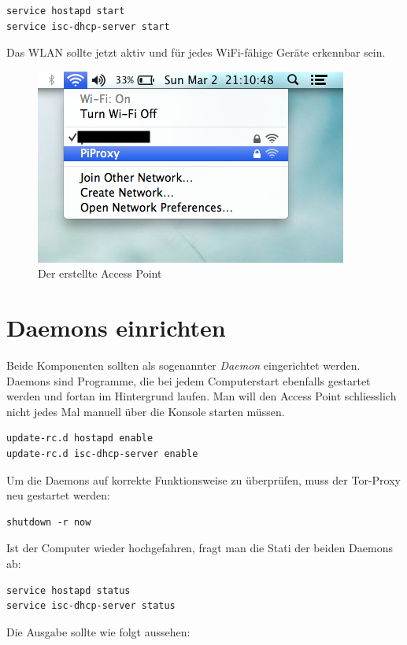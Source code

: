 \begin{lstlisting}
service hostapd start
service isc-dhcp-server start
\end{lstlisting}

Das WLAN sollte jetzt aktiv und für jedes WiFi-fähige Geräte erkennbar sein.

\begin{figure}[h]
\centering
\includegraphics[scale=0.7]{images/accesspoint}
\caption{Der erstellte Access Point}
\end{figure}

\section{Daemons einrichten}
Beide Komponenten sollten als sogenannter \textit{Daemon} eingerichtet werden. Daemons sind Programme, die bei jedem Computerstart ebenfalls gestartet werden und fortan im Hintergrund laufen. Man will den Access Point schliesslich nicht jedes Mal manuell über die Konsole starten müssen. 

\begin{lstlisting}
update-rc.d hostapd enable 
update-rc.d isc-dhcp-server enable
\end{lstlisting}

Um die Daemons auf korrekte Funktionsweise zu überprüfen, muss der Tor-Proxy neu gestartet werden:

\begin{lstlisting}
shutdown -r now 
\end{lstlisting}

Ist der Computer wieder hochgefahren, fragt man die Stati der beiden Daemons ab:

\begin{lstlisting}
service hostapd status
service isc-dhcp-server status
\end{lstlisting}

Die Ausgabe sollte wie folgt aussehen: 

